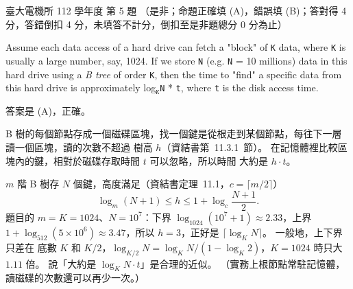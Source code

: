 \begin{pastexam}[label={px:ntu-112-ee-ds-05}]{臺大電機所 112 學年度 第 5 題}
（是非；命題正確填 (A)，錯誤填 (B)；答對得 4 分，答錯倒扣 4 分，未填答不計分，倒扣至是非題總分 0 分為止）

Assume each data access of a hard drive can fetch a "block" of \texttt{K} data, where \texttt{K} is usually a large number, say, 1024. If we store \texttt{N} (e.g. \texttt{N} = 10 millions) data in this hard drive using a \textit{B tree} of order \texttt{K}, then the time to "find" a specific data from this hard drive is approximately log$_{\texttt{K}}$\texttt{N} * \texttt{t}, where \texttt{t} is the disk access time.
\end{pastexam}

\begin{pastsoln}
答案是 (A)，正確。

B 樹的每個節點存成一個磁碟區塊，找一個鍵是從根走到某個節點，每往下一層讀一個區塊，讀的次數不超過
樹高 $h$（資結書第~11.3.1~節）。 在記憶體裡比較區塊內的鍵，相對於磁碟存取時間 $t$ 可以忽略，所以時間
大約是 $h \cdot t$。

$m$ 階 B 樹存 $N$ 個鍵，高度滿足（資結書定理~11.1，$c = \lceil m/2 \rceil$）
\[
\log_m(N + 1) \le h \le 1 + \log_c \frac{N + 1}{2}.
\]
題目的 $m = K = 1024$、$N = 10^7$：下界 $\log_{1024}(10^7 + 1) \approx 2.33$，上界
$1 + \log_{512}(5 \times 10^6) \approx 3.47$，所以 $h = 3$，正好是 $\lceil \log_K N \rceil$。 一般地，上下界只差在
底數 $K$ 和 $K/2$，$\log_{K/2} N = \log_K N / (1 - \log_K 2)$，$K = 1024$ 時只大 $1.11$ 倍。 說「大約是
$\log_K N \cdot t$」是合理的近似。 （實務上根節點常駐記憶體，讀磁碟的次數還可以再少一次。）
\end{pastsoln}
